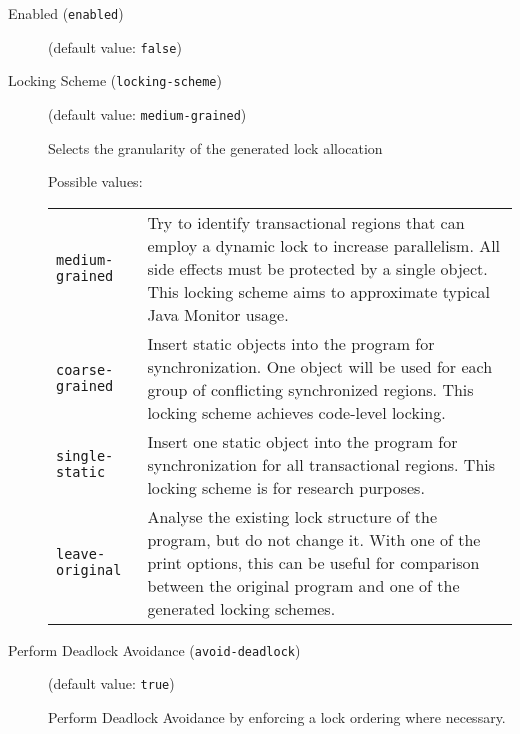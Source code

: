\documentclass{article}
\begin{document}
\begin{description}

\item[Enabled ({\tt enabled})]
(default value: {\tt false})






\item[Locking Scheme ({\tt locking-scheme})]
(default value: {\tt medium-grained})



Selects the granularity of the generated lock allocation



Possible values:\\
\begin{longtable}{p{1in}p{4in}}

{\tt medium-grained }
&

Try to identify transactional regions that can employ a dynamic lock to
increase parallelism.  All side effects must be protected by a single object.
This locking scheme aims to approximate typical Java Monitor usage.
\\

{\tt coarse-grained }
&

Insert static objects into the program for synchronization.  One object will be
used for each group of conflicting synchronized regions.  This locking scheme
achieves code-level locking.
\\

{\tt single-static }
&

Insert one static object into the program for synchronization for all
transactional regions.  This locking scheme is for research purposes.
\\

{\tt leave-original }
&

Analyse the existing lock structure of the program, but do not change it.  With
one of the print options, this can be useful for comparison between the original
program and one of the generated locking schemes.
\\

\end{longtable}


\item[Perform Deadlock Avoidance ({\tt avoid-deadlock})]
(default value: {\tt true})




Perform Deadlock Avoidance by enforcing a lock ordering where necessary.




\end{description}
\end{document}
